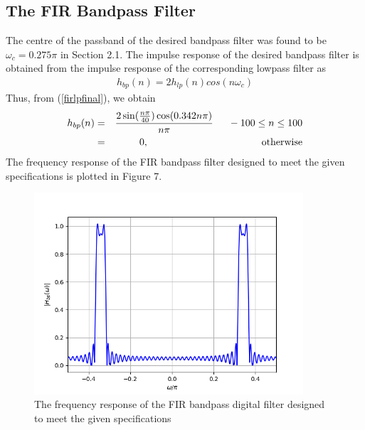 \documentclass[journal,12pt,twocolumn]{IEEEtran}
\theoremstyle{remark}
\begin{document}
\subsection{\textbf{The FIR Bandpass Filter}}
The centre of the passband of the desired bandpass filter was found to be $\omega_c = 0.275\pi$ in Section
2.1.  The impulse response of the desired bandpass filter is obtained from the impulse response of the
corresponding lowpass filter as
\begin{eqnarray}
h_{bp}(n) = 2h_{lp}(n)cos(n\omega_c)
\end{eqnarray}
Thus, from (\ref{firlpfinal}), we obtain
\begin{eqnarray}
\label{firbpfinal}
h_{bp}(n) &=& \frac{2\sin(\frac{n\pi}{40}) \cos(0.342n\pi)}{n\pi} \indent -100 \leq n \leq 100 \nonumber \\
&=& 0, \hspace{4cm} \mbox{otherwise}
\end{eqnarray}
%
The frequency response of the FIR bandpass filter designed to meet the given specifications is plotted in Figure 7.
\begin{figure}[h!]
\label{fig6}
\includegraphics[width = 10cm]{figs/figure6.png}
\caption{The frequency response of the FIR bandpass digital filter designed to meet the given specifications} 
\end{figure}
\end{document}
